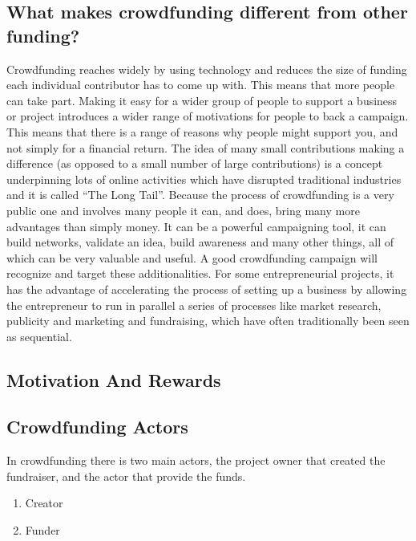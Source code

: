 \subsection*{ What makes crowdfunding different from other funding? }
Crowdfunding reaches widely by using technology and reduces the size of funding each individual contributor has to come up with. This means that more people can take part.
Making it easy for a wider group of people to support a business or project introduces a wider range of motivations for people to back a campaign. This means that there is a range of reasons why people might support you, and not simply for a financial return.
The idea of many small contributions making a difference (as opposed to a small number of large contributions) is a concept underpinning lots of online activities which have disrupted traditional industries and it is called “The Long Tail”.
Because the process of crowdfunding is a very public one and involves many people it can, and does, bring many more advantages than simply money. It can be a powerful campaigning tool, it can build networks, validate an idea, build awareness and many other things, all of which can be very valuable and useful. A good crowdfunding campaign will recognize and target these additionalities.
For some entrepreneurial projects, it has the advantage of accelerating the process of setting up a business by allowing the entrepreneur to run in parallel a series of processes like market research, publicity and marketing and fundraising, which have often traditionally been seen as sequential.



\subsection*{ Motivation And Rewards }



\subsection*{ Crowdfunding Actors }
In crowdfunding there is two main actors, the project owner that created the fundraiser, and the actor that provide the funds.
\begin{enumerate}
      \item Creator
      \item Funder
\end{enumerate}

